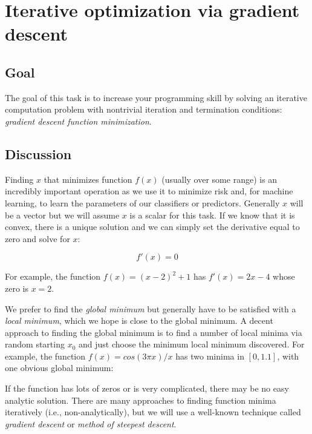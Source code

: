 \chapter{Iterative optimization via gradient descent}

\section{Goal}

\begin{fullwidth}

The goal of this task is to increase your programming skill by solving an iterative computation problem with nontrivial iteration and termination conditions: {\em gradient descent function minimization}.

\section{Discussion}

Finding $x$ that minimizes function $f(x)$ (usually over some range) is an incredibly important operation as we use it to minimize risk and, for machine learning, to learn the parameters of our classifiers or predictors. Generally $x$ will be a vector but we will assume $x$ is a scalar for this task. If we know that it is convex, there is a unique solution and we can simply set the derivative equal to zero and solve for $x$:

\[\tag{Analytic solution to convex optimization}
f'(x) = 0
\]

\noindent For example, the function $f(x) = (x-2)^2 + 1$ has $f'(x) = 2x - 4$ whose zero is $x=2$.


We prefer to find the {\em global minimum} but generally have to be satisfied with a {\em local minimum}, which we hope is close to the global minimum. A decent approach to finding the global minimum is to find a number of local minima via random starting $x_0$ and just choose the minimum local minimum discovered. For example, the function $f(x) = cos(3\pi x) / x$ has two minima in $[0,1.1]$, with one obvious global minimum:


If the function has lots of zeros or is very complicated, there may be no easy analytic solution.
There are many approaches to finding function minima iteratively (i.e., non-analytically), but we will use a well-known technique called {\em gradient descent} or {\em method of steepest descent}.  


\end{fullwidth}
